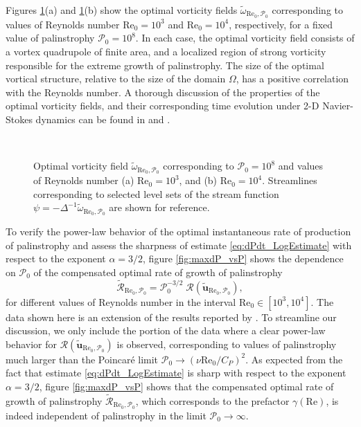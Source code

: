 \documentclass[11pt]{article}
\def\P{{\mathcal{P}}}
\def\R{{\mathcal{R}}}
\newcommand{\laplacian}{\Delta}
\newcommand{\Reyn}{\textrm{Re}}
\newcommand{\tuvecRP}{\widetilde{\mathbf{u}}_{\Reyn_0,\P_0}}
\newcommand{\twRP}{\widetilde{\omega}_{\Reyn_0,\P_0}}
\begin{document}
Figures \ref{fig:OptimVort_vsK_P07}(a) and \ref{fig:OptimVort_vsK_P07}(b) show the optimal vorticity fields $\twRP$ corresponding to values of Reynolds number $\Reyn_0 = 10^3$ and $\Reyn_0 = 10^4$, respectively, for a fixed value of palinstrophy $\P_0 = 10^8$.  In each case, the optimal vorticity field consists of a vortex quadrupole of finite area, and a localized region of strong vorticity responsible for the extreme growth of palinstrophy. The size of the optimal vortical structure, relative to the size of the domain $\Omega$, has a positive correlation with the Reynolds number. A thorough discussion of the properties of the optimal vorticity fields, and their corresponding time evolution under 2-D Navier-Stokes dynamics can be found in \cite{ap13a} and \cite{ap13b}.


\begin{figure}
\linespread{1.1}
\setcounter{subfigure}{0}
\begin{center}
\\
\caption[Optimal vorticity field vs $\Reyn$]{Optimal vorticity field $\twRP$ corresponding to $\P_0 = 10^8$ and values of Reynolds number (a) $\Reyn_0 = 10^3$,  and (b) $\Reyn_0 = 10^4$. Streamlines corresponding to selected level sets of the stream function $\psi = -\laplacian^{-1}\twRP$ are shown for reference.
}
\label{fig:OptimVort_vsK_P07}
\end{center}
\end{figure}

To verify the power-law behavior of the optimal instantaneous rate of production of palinstrophy and assess the sharpness of estimate \ref{eq:dPdt_LogEstimate} with respect to the exponent $\alpha = 3/2$, figure \ref{fig:maxdP_vsP} shows the dependence on $\P_0$ of the compensated optimal rate of growth of palinstrophy 
\begin{equation}
\widetilde{\R}_{\Reyn_0,\P_0} = \P^{-3/2}_0\;\R(\tuvecRP),
\end{equation}
for different values of Reynolds number in the interval $\Reyn_0\in [10^3,10^4]$.  The data shown here is an extension of the results reported by \cite{ap13a}. To streamline our discussion, we only include the portion of the data where a clear power-law behavior for 
$\R(\tuvecRP)$ is observed, corresponding to values of palinstrophy much larger than the Poincar\'e limit $\P_0 \to (\nu\Reyn_0/C_P)^2$. As expected from the fact that estimate \eqref{eq:dPdt_LogEstimate} is sharp with respect to the exponent $\alpha = 3/2$, figure \ref{fig:maxdP_vsP} shows that the compensated optimal rate of growth of palinstrophy $\widetilde{\R}_{\Reyn_0,\P_0}$, which corresponds to the prefactor $\gamma(\Reyn)$, is indeed independent of palinstrophy in the limit $\P_0\to\infty$. 
\end{document}
